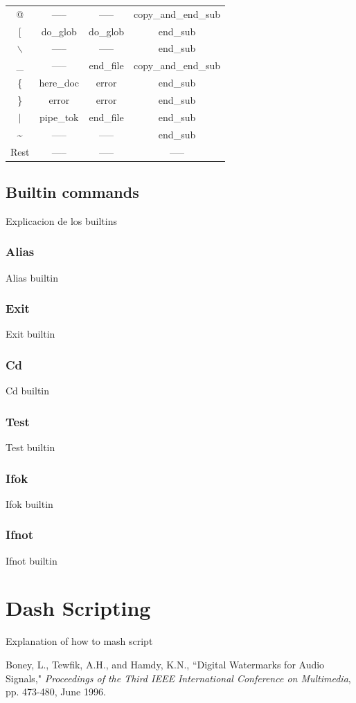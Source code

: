 \documentclass[12pt,a4paper]{report}
\begin{document}
\begin{table}[H]
\begin{tabular}{ |c|c|c|c| }
		@ & ----- & ----- & copy\_and\_end\_sub \cellcolor[HTML]{FFF49C}\\
		$[$ & do\_glob & do\_glob &  end\_sub \cellcolor[HTML]{FFF49C}\\
		$\backslash$ & ----- & ----- &  end\_sub \cellcolor[HTML]{FFF49C}\\
		\_ & ----- & end\_file \cellcolor[HTML]{BEE9F9}& copy\_and\_end\_sub \cellcolor[HTML]{FFF49C}\\
		\{ & here\_doc & error \cellcolor[HTML]{FF0044} &  end\_sub \cellcolor[HTML]{FFF49C}\\
		\} & error \cellcolor[HTML]{FF0044} & error \cellcolor[HTML]{FF0044} &  end\_sub \cellcolor[HTML]{FFF49C} \\
		$|$ & pipe\_tok & end\_file\cellcolor[HTML]{BEE9F9} &  end\_sub \cellcolor[HTML]{FFF49C}\\
		\textasciitilde  & ----- & ----- &  end\_sub \cellcolor[HTML]{FFF49C}\\
		Rest  & ----- & ----- &  ----- \\
		\hline
	\end{tabular}
\end{table}
\chapter{Builtin commands}
Explicacion de los builtins
\section{Alias}
Alias builtin
\section{Exit}
Exit builtin
\section{Cd}
Cd builtin
\section{Test}
Test builtin
\section{Ifok}
Ifok builtin
\section{Ifnot}
Ifnot builtin
\part{Dash Scripting}
Explanation of how to mash script
\begin{thebibliography}{100} %
	 Boney, L., Tewfik, A.H., and Hamdy, K.N., ``Digital
	Watermarks for Audio Signals," \emph{Proceedings of the Third IEEE
		International Conference on Multimedia}, pp. 473-480, June 1996.
\end{thebibliography}
\end{document}
